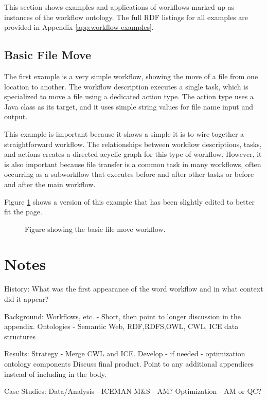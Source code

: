 This section shows examples and applications of workflows marked up as
instances of the workflow ontology. The full RDF listings for all
examples are provided in Appendix \ref{app:workflow-examples}.

\subsection{Basic File Move}

The first example is a very simple workflow, showing the move of a file from
one location to another. The workflow description executes a single task, which
is specialized to move a file using a dedicated action type. The action type
uses a Java class as its target, and it uses simple string values for file name
input and output.

This example is important because it shows a simple it is to wire together a
straightforward workflow. The relationships between workflow descriptions,
tasks, and actions creates a directed acyclic graph for this type of workflow.
However, it is also important because file transfer is a common task in many
workflows, often occurring as a subworkflow that executes before and after
other tasks or before and after the main workflow.

Figure \ref{move-workflows} shows a version of this example that has been
slightly edited to better fit the page.

\begin{figure}[htbp]
\centering
{}
\caption{Figure showing the basic file move workflow.}
\label{move-workflows}
\end{figure}

\section{Notes}

History:
What was the first appearance of the word workflow and in what context did it
appear?

Background:
Workflows, etc. - Short, then point to longer discussion in the appendix.
Ontologies - Semantic Web, {RDF,RDFS,OWL}, CWL, ICE data structures

Results:
Strategy - Merge CWL and ICE. Develop - if needed - optimization ontology components
Discuss final product. Point to any additional appendices instead of including in the body.

Case Studies:
Data/Analysis - ICEMAN
M\&S - AM?
Optimization - AM or QC?


